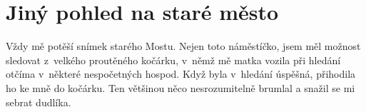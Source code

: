 
\chapter{Jiný pohled na staré město}

Vždy mě potěší snímek starého Mostu. Nejen toto náměstíčko, jsem měl možnost
sledovat z~velkého proutěného kočárku, v~němž mě matka vozila při hledání
otčíma v~některé nespočetných hospod. Když byla v~hledání úspěšná, přihodila ho
ke mně do kočárku. Ten většinou něco nesrozumitelně brumlal a snažil se mi
sebrat dudlíka.

